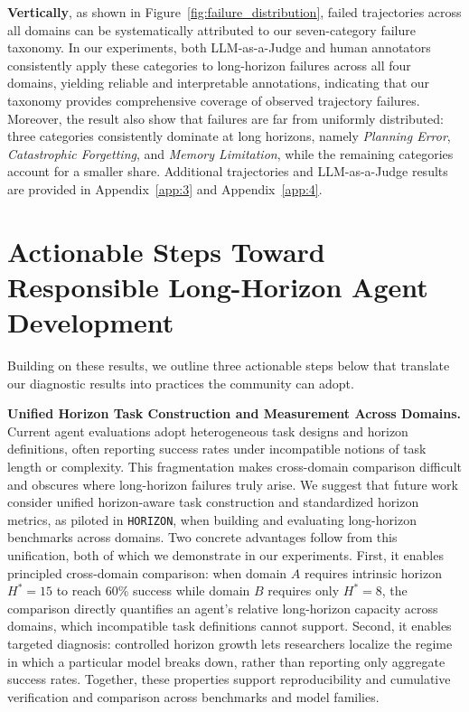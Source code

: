 \documentclass[11pt]{article}
\begin{document}


\textbf{Vertically}, as shown in Figure~\ref{fig:failure_distribution}, failed trajectories across all domains can be systematically attributed to our seven-category failure taxonomy. In our experiments, both LLM-as-a-Judge and human annotators consistently apply these categories to long-horizon failures across all four domains, yielding reliable and interpretable annotations, indicating that our taxonomy provides comprehensive coverage of observed trajectory failures.
Moreover, the result also show that failures are far from uniformly
distributed: three categories consistently dominate at long horizons,
namely \textit{Planning Error}, \textit{Catastrophic Forgetting}, and
\textit{Memory Limitation}, while the remaining categories account for
a smaller share.
Additional trajectories and LLM-as-a-Judge results are provided in
Appendix~\ref{app:3} and Appendix~\ref{app:4}.


\section{Actionable Steps Toward Responsible Long-Horizon Agent Development} \label{sec:4}

Building on these results, we outline three actionable steps below that translate our diagnostic results into practices the community can adopt.

\textbf{Unified Horizon Task Construction and Measurement Across Domains.}
Current agent evaluations adopt heterogeneous task designs and horizon definitions, often reporting success rates under incompatible notions of task length or complexity. This fragmentation makes cross-domain comparison difficult and obscures where long-horizon failures truly arise. 
We suggest that future work consider unified horizon-aware task construction and standardized horizon metrics, as piloted in \texttt{HORIZON}, when building and evaluating long-horizon benchmarks across domains.
Two concrete advantages follow from this unification, both of which we demonstrate in our experiments. 
First, it enables principled cross-domain comparison: when domain $A$ requires intrinsic horizon $H^* = 15$ to reach 60\% success while domain $B$ requires only $H^* = 8$, the comparison directly quantifies an agent's relative long-horizon capacity across domains, which incompatible task definitions cannot support. 
Second, it enables targeted diagnosis: controlled horizon growth lets researchers localize the regime in which a particular model breaks down, rather than reporting only aggregate success rates. 
Together, these properties support reproducibility and cumulative verification and comparison across benchmarks and model families.
\end{document}
